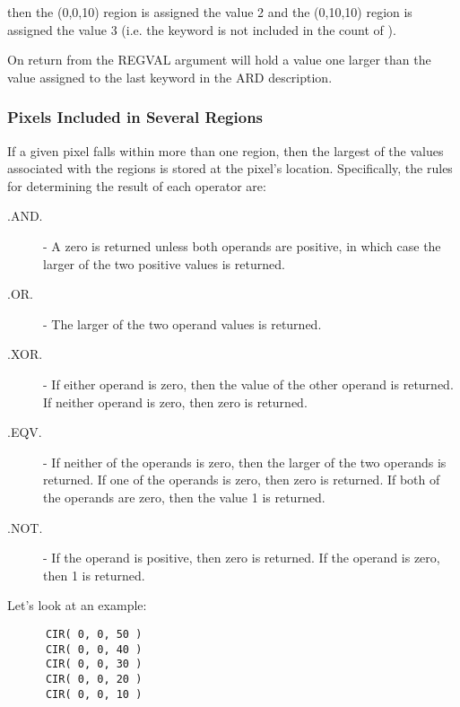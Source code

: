 then the (0,0,10) region is assigned the value 2 and the (0,10,10)
region is assigned the value 3 (i.e. the  keyword is not included in the
count of ).

On return from  the REGVAL argument will hold a value one larger than
the value assigned to the last keyword in the ARD description. 

\subsubsection{Pixels Included in Several Regions}
If a given pixel falls within more than one region, then the largest of the
values associated with the regions is stored at the pixel's location.
Specifically, the rules for determining the result of each operator are: 

\begin{description}
\item [.AND.] - A zero is returned unless both operands are positive, in which 
case the larger of the two positive values is returned.
\item [.OR.] - The larger of the two operand values is returned.
\item [.XOR.] - If either operand is zero, then the value of the other operand
is returned. If neither operand is zero, then zero is returned.
\item [.EQV.] - If neither of the operands is zero, then the larger of the two
operands is returned. If one of the operands is zero, then zero is returned. If
both of the operands are zero, then the value 1 is returned.
\item [.NOT.] - If the operand is positive, then zero is returned. If the
operand is zero, then 1 is returned.
\end{description}

Let's look at an example:

\small
\begin{verbatim}
      CIR( 0, 0, 50 )
      CIR( 0, 0, 40 )
      CIR( 0, 0, 30 )
      CIR( 0, 0, 20 )
      CIR( 0, 0, 10 )
\end{verbatim}
\normalsize

